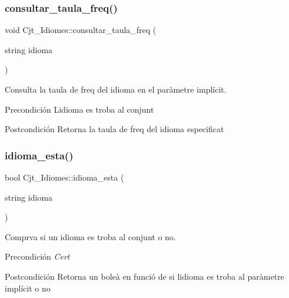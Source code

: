 \subsubsection{\texorpdfstring{consultar\+\_\+taula\+\_\+freq()}{consultar\_taula\_freq()}}
{\footnotesize\ttfamily void Cjt\+\_\+\+Idiomes\+::consultar\+\_\+taula\+\_\+freq (\begin{DoxyParamCaption}\item[{string}]{idioma }\end{DoxyParamCaption})}



Consulta la taula de freq del idioma en el paràmetre implícit. 

\begin{DoxyPrecond}{Precondición}
L\textquotesingle{}idioma es troba al conjunt 
\end{DoxyPrecond}
\begin{DoxyPostcond}{Postcondición}
Retorna la taula de freq del idioma especificat 
\end{DoxyPostcond}
\mbox{\label{class_cjt___idiomes_a4c46be5ecf3b12b3f481ace7d487fdc3}} 
\subsubsection{\texorpdfstring{idioma\+\_\+esta()}{idioma\_esta()}}
{\footnotesize\ttfamily bool Cjt\+\_\+\+Idiomes\+::idioma\+\_\+esta (\begin{DoxyParamCaption}\item[{string}]{idioma }\end{DoxyParamCaption})}



Comprva si un idioma es troba al conjunt o no. 

\begin{DoxyPrecond}{Precondición}
{\itshape Cert} 
\end{DoxyPrecond}
\begin{DoxyPostcond}{Postcondición}
Retorna un boleà en funció de si l\textquotesingle{}idioma es troba al paràmetre implícit o no 
\end{DoxyPostcond}
\mbox{\label{class_cjt___idiomes_a7aad6974355b73c50c2d5c1edc0a5c14}} 
